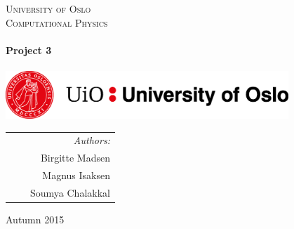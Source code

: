 \thispagestyle{empty}

\begin{center}



\textsc{\LARGE University of Oslo}\\[0.5cm]

\textsc{\Large Computational Physics}\\[2cm]
 

\HRule \\[0.4cm]
 \LARGE \textbf{Project 3}  \\[0.2cm]
\HRule \\[2.5cm]

\vspace{2cm}
\includegraphics[width=0.8\textwidth]{Figures/UiO_Seal_A_ENG.png}\\  %

\vfill 
 
\begin{tabularx}{\textwidth}{l X r}
\hline
& & \large \emph{Authors:}\\
& & \large Birgitte Madsen\\
& & \large Magnus Isaksen \\
& & \large Soumya Chalakkal \\
\hline

\end{tabularx}




\vfill

{\large Autumn 2015}

\end{center}
\cleardoublepage


